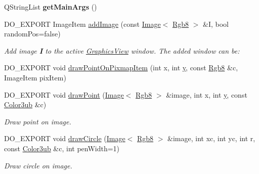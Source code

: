 \begin{DoxyCompactItemize}
\item 
\hypertarget{group___graphics_internal_ga355fd93aa33de5ae5eb97ce9fee10768}{Q\-String\-List {\bfseries get\-Main\-Args} ()}\label{group___graphics_internal_ga355fd93aa33de5ae5eb97ce9fee10768}

\item 
D\-O\-\_\-\-E\-X\-P\-O\-R\-T Image\-Item \hyperlink{group___graphics_view_ga26dd076d57f9e1e5e6ea70fb5383a0f3}{add\-Image} (const \hyperlink{class_d_o_1_1_image}{Image}$<$ \hyperlink{group___color_types_gabba376766e70e08cdaccf69fa903f526}{Rgb8} $>$ \&I, bool random\-Pos=false)
\begin{DoxyCompactList}\small\item\em Add image {\bfseries I} to the active \hyperlink{class_d_o_1_1_graphics_view}{Graphics\-View} window. The added window can be\-: \end{DoxyCompactList}\item 
D\-O\-\_\-\-E\-X\-P\-O\-R\-T void \hyperlink{group___graphics_view_ga90520e24f6b25d7da37cdf425b6c4795}{draw\-Point\-On\-Pixmap\-Item} (int x, int \hyperlink{group___channel_accessors_gac90c52c5b3a7b2a7e3761e6e84f25778}{y}, const \hyperlink{group___color_types_gabba376766e70e08cdaccf69fa903f526}{Rgb8} \&c, Image\-Item pix\-Item)
\item 
D\-O\-\_\-\-E\-X\-P\-O\-R\-T void \hyperlink{group___image_drawing_gac01a694d079363a4ee4e0c06baaddcb7}{draw\-Point} (\hyperlink{class_d_o_1_1_image}{Image}$<$ \hyperlink{group___color_types_gabba376766e70e08cdaccf69fa903f526}{Rgb8} $>$ \&image, int x, int \hyperlink{group___channel_accessors_gac90c52c5b3a7b2a7e3761e6e84f25778}{y}, const \hyperlink{group___color_types_ga018b76cd00a4f9dca7dd06246d5bd3aa}{Color3ub} \&c)
\begin{DoxyCompactList}\small\item\em Draw point on image. \end{DoxyCompactList}\item 
D\-O\-\_\-\-E\-X\-P\-O\-R\-T void \hyperlink{group___image_drawing_gaf99b9267edc72d74cda95f33baaa7e2a}{draw\-Circle} (\hyperlink{class_d_o_1_1_image}{Image}$<$ \hyperlink{group___color_types_gabba376766e70e08cdaccf69fa903f526}{Rgb8} $>$ \&image, int xc, int yc, int r, const \hyperlink{group___color_types_ga018b76cd00a4f9dca7dd06246d5bd3aa}{Color3ub} \&c, int pen\-Width=1)
\begin{DoxyCompactList}\small\item\em Draw circle on image. \end{DoxyCompactList}\item 

\end{DoxyCompactItemize}

